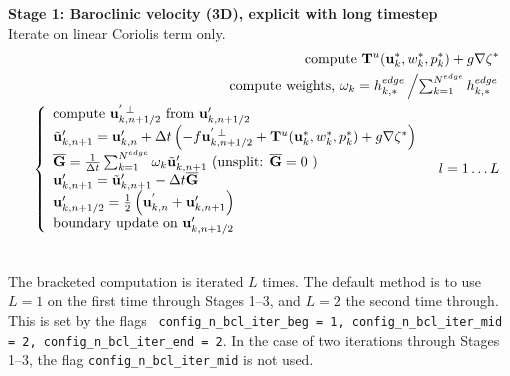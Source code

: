 \documentclass[11pt]{report}
\begin{document}
{\bf Stage 1: Baroclinic velocity (3D), explicit with long timestep}\\
Iterate on linear Coriolis term only.
\begin{eqnarray} &&
\mbox{compute } {\bf T}^u({\bf u}_k^*,w_k^*,p_k^*) +g\nabla \zeta^* \\ &&
\mbox{compute weights, }\omega_k  =  h_{k,*}^{edge}
\left/\textstyle\sum_{k=1}^{N^{edge}} h_{k,*}^{edge}
\right.\\ &&
\left\{\begin{array}{l} \label{u bcl s2} 
\mbox{compute }{\bf u}_{k,n+1/2}^{'\;\perp}\mbox{ from }{\bf u}_{k,n+1/2}'\\ 
{\tilde {\bf u}}'_{k,n+1} = {\bf u}'_{k,n} + \Delta t 
\left( -f{\bf u}_{k,n+1/2}^{'\;\perp} + {\bf T}^u({\bf u}_k^*,w_k^*,p_k^*) 
+g\nabla \zeta^* \right)
\\  
{\overline {\bf G}} = 
\frac{1}{\Delta t}
\sum_{k=1}^{N^{edge}} \omega_k {\tilde {\bf u}}'_{k,n+1}
\mbox{ (unsplit: ${\overline {\bf G}} =0$ )}
\\ 
{\bf u}'_{k,n+1} = {\tilde {\bf u}}'_{k,n+1} - \Delta t {\overline {\bf G}}
\\
{\bf u}'_{k,n+1/2} = \frac{1}{2}\left({\bf u}^{'}_{k,n} +{\bf u}'_{k,n+1}\right) 
\\
\mbox{boundary update on }{\bf u}'_{k,n+1/2}
\end{array}
\right. \;\;\; l=1\ldots L \\ &&
\end{eqnarray}

The bracketed computation is iterated $L$ times.  The default method is to use $L=1$ on the first time through Stages 1--3, and $L=2$ the second time through.  This is set by the flags {\tt
config\_n\_bcl\_iter\_beg = 1, config\_n\_bcl\_iter\_mid = 2, config\_n\_bcl\_iter\_end = 2}.
In the case of two iterations through Stages 1--3, the flag {\tt config\_n\_bcl\_iter\_mid} is not used.
\end{document}

